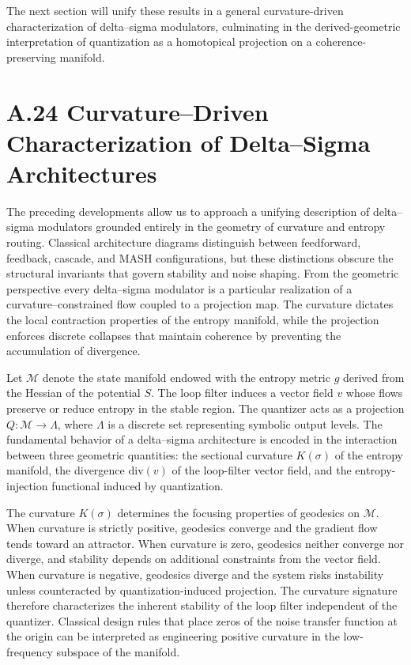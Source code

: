The next section will unify these results in a general curvature-driven characterization of delta–sigma modulators, culminating in the derived-geometric interpretation of quantization as a homotopical projection on a coherence-preserving manifold.

\section{A.24 Curvature–Driven Characterization of Delta–Sigma Architectures}

The preceding developments allow us to approach a unifying description of delta–sigma modulators grounded entirely in the geometry of curvature and entropy routing. Classical architecture diagrams distinguish between feedforward, feedback, cascade, and MASH configurations, but these distinctions obscure the structural invariants that govern stability and noise shaping. From the geometric perspective every delta–sigma modulator is a particular realization of a curvature–constrained flow coupled to a projection map. The curvature dictates the local contraction properties of the entropy manifold, while the projection enforces discrete collapses that maintain coherence by preventing the accumulation of divergence.

Let \(\mathcal{M}\) denote the state manifold endowed with the entropy metric \(g\) derived from the Hessian of the potential \(S\). The loop filter induces a vector field \(v\) whose flows preserve or reduce entropy in the stable region. The quantizer acts as a projection \(Q:\mathcal{M}\to\Lambda\), where \(\Lambda\) is a discrete set representing symbolic output levels. The fundamental behavior of a delta–sigma architecture is encoded in the interaction between three geometric quantities: the sectional curvature \(K(\sigma)\) of the entropy manifold, the divergence \(\mathrm{div}(v)\) of the loop-filter vector field, and the entropy-injection functional induced by quantization.

The curvature \(K(\sigma)\) determines the focusing properties of geodesics on \(\mathcal{M}\). When curvature is strictly positive, geodesics converge and the gradient flow tends toward an attractor. When curvature is zero, geodesics neither converge nor diverge, and stability depends on additional constraints from the vector field. When curvature is negative, geodesics diverge and the system risks instability unless counteracted by quantization-induced projection. The curvature signature therefore characterizes the inherent stability of the loop filter independent of the quantizer. Classical design rules that place zeros of the noise transfer function at the origin can be interpreted as engineering positive curvature in the low-frequency subspace of the manifold.


